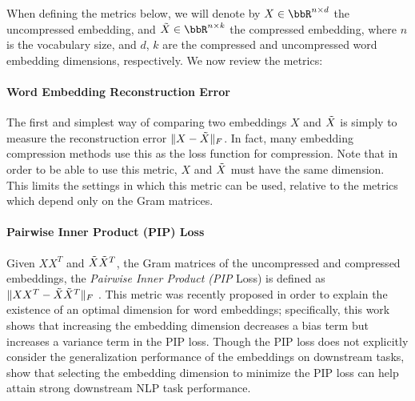 When defining the metrics below, we will denote by $X \in \RR^{n\times d}$ the uncompressed embedding, and $\tX \in \RR^{n \times k}$ the compressed embedding, where $n$ is the vocabulary size, and $d$, $k$ are the compressed and uncompressed word embedding dimensions, respectively.
We now review the metrics:



\paragraph{Word Embedding Reconstruction Error}
The first and simplest way of comparing two embeddings $X$ and $\tX$ is simply to measure the reconstruction error $\|X-\tX\|_F$.
In fact, many embedding compression methods \citep{andrews16,dccl17} use this as the loss function for compression.
Note that in order to be able to use this metric, $X$ and $\tX$ must have the same dimension.
This limits the settings in which this metric can be used, relative to the metrics which depend only on the Gram matrices.

\paragraph{Pairwise Inner Product (PIP) Loss}
Given $XX^T$ and $\tX\tX^T$, the Gram matrices of the uncompressed and compressed embeddings, the \textit{Pairwise Inner Product (PIP} Loss) is defined as $\|XX^T -\tX\tX^T\|_F$ \citep{yin18}.
This metric was recently proposed in order to explain the existence of an optimal dimension for word embeddings;
specifically, this work shows that increasing the embedding dimension decreases a bias term but increases a variance term in the PIP loss.
Though the PIP loss does not explicitly consider the generalization performance of the embeddings on downstream tasks, \citep{yin18} show that selecting the embedding dimension to minimize the PIP loss can help attain strong downstream NLP task performance.

